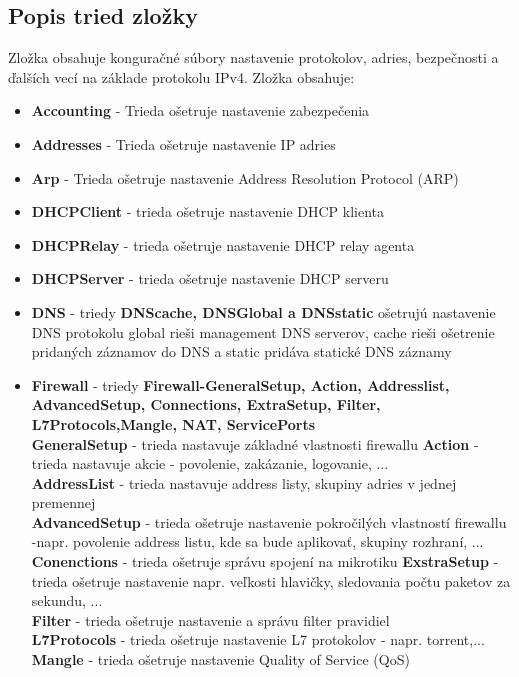 \subsection{Popis tried zložky}
Zložka obsahuje konguračné súbory nastavenie protokolov, adries, bezpečnosti a ďalších vecí na základe protokolu  IPv4. Zložka obsahuje:
\begin{itemize}
\item \textbf{Accounting} - Trieda ošetruje nastavenie zabezpečenia
\item \textbf{Addresses} - Trieda ošetruje nastavenie IP adries
\item \textbf{Arp} - Trieda ošetruje nastavenie Address Resolution Protocol (ARP) 
\item \textbf{DHCPClient} - trieda ošetruje nastavenie DHCP klienta
\item \textbf{DHCPRelay} - trieda ošetruje nastavenie DHCP relay agenta
\item \textbf{DHCPServer} - trieda ošetruje nastavenie DHCP serveru
\item \textbf{DNS} - triedy \textbf{DNScache, DNSGlobal a DNSstatic} ošetrujú nastavenie DNS protokolu global rieši management DNS serverov, cache rieši ošetrenie pridaných záznamov do DNS a static pridáva statické DNS záznamy
\item \textbf{Firewall} - triedy \textbf{Firewall-GeneralSetup, Action, Addresslist, AdvancedSetup,  Connections, ExtraSetup, Filter, L7Protocols,Mangle, NAT, ServicePorts}\\
\textbf{GeneralSetup} - trieda nastavuje základné vlastnosti firewallu
\textbf{Action} - trieda nastavuje akcie - povolenie, zakázanie, logovanie, ... \\
\textbf{AddressList} - trieda nastavuje address listy, skupiny adries v jednej premennej\\
\textbf{AdvancedSetup} - trieda ošetruje nastavenie pokročilých vlastností firewallu -napr. povolenie address listu, kde sa bude aplikovať, skupiny rozhraní, ...\\
\textbf{Conenctions} - trieda ošetruje správu spojení na mikrotiku
\textbf{ExstraSetup} - trieda ošetruje nastavenie napr. veľkosti hlavičky, sledovania počtu paketov za sekundu, ...\\
\textbf{Filter} - trieda ošetruje nastavenie a správu filter pravidiel\\
\textbf{L7Protocols} - trieda ošetruje nastavenie L7 protokolov - napr. torrent,...\\
\textbf{Mangle} - trieda ošetruje nastavenie Quality of Service (QoS)\\

\end{itemize}
